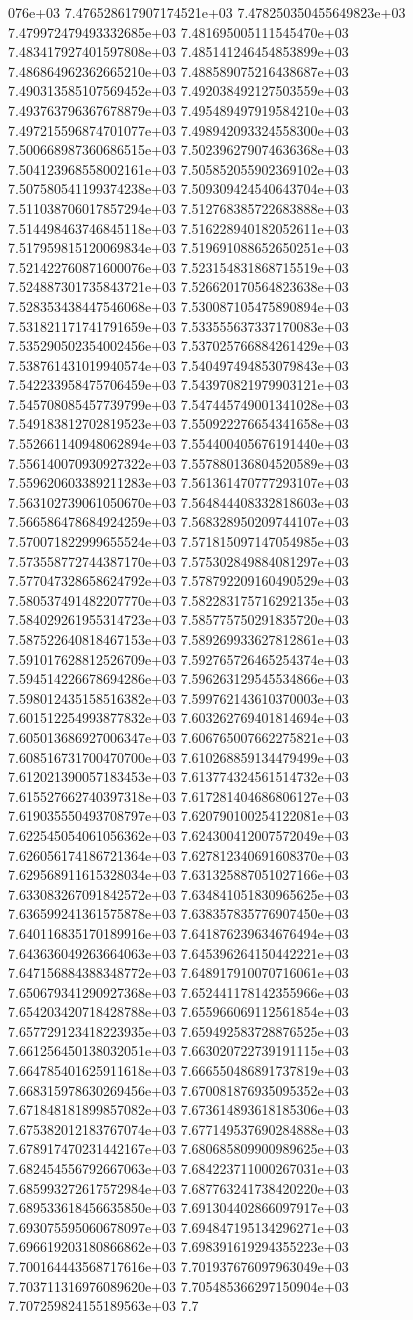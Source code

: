 076e+03	7.476528617907174521e+03	7.478250350455649823e+03	7.479972479493332685e+03	7.481695005111545470e+03	7.483417927401597808e+03	7.485141246454853899e+03	7.486864962362665210e+03	7.488589075216438687e+03	7.490313585107569452e+03	7.492038492127503559e+03	7.493763796367678879e+03	7.495489497919584210e+03	7.497215596874701077e+03	7.498942093324558300e+03	7.500668987360686515e+03	7.502396279074636368e+03	7.504123968558002161e+03	7.505852055902369102e+03	7.507580541199374238e+03	7.509309424540643704e+03	7.511038706017857294e+03	7.512768385722683888e+03	7.514498463746845118e+03	7.516228940182052611e+03	7.517959815120069834e+03	7.519691088652650251e+03	7.521422760871600076e+03	7.523154831868715519e+03	7.524887301735843721e+03	7.526620170564823638e+03	7.528353438447546068e+03	7.530087105475890894e+03	7.531821171741791659e+03	7.533555637337170083e+03	7.535290502354002456e+03	7.537025766884261429e+03	7.538761431019940574e+03	7.540497494853079843e+03	7.542233958475706459e+03	7.543970821979903121e+03	7.545708085457739799e+03	7.547445749001341028e+03	7.549183812702819523e+03	7.550922276654341658e+03	7.552661140948062894e+03	7.554400405676191440e+03	7.556140070930927322e+03	7.557880136804520589e+03	7.559620603389211283e+03	7.561361470777293107e+03	7.563102739061050670e+03	7.564844408332818603e+03	7.566586478684924259e+03	7.568328950209744107e+03	7.570071822999655524e+03	7.571815097147054985e+03	7.573558772744387170e+03	7.575302849884081297e+03	7.577047328658624792e+03	7.578792209160490529e+03	7.580537491482207770e+03	7.582283175716292135e+03	7.584029261955314723e+03	7.585775750291835720e+03	7.587522640818467153e+03	7.589269933627812861e+03	7.591017628812526709e+03	7.592765726465254374e+03	7.594514226678694286e+03	7.596263129545534866e+03	7.598012435158516382e+03	7.599762143610370003e+03	7.601512254993877832e+03	7.603262769401814694e+03	7.605013686927006347e+03	7.606765007662275821e+03	7.608516731700470700e+03	7.610268859134479499e+03	7.612021390057183453e+03	7.613774324561514732e+03	7.615527662740397318e+03	7.617281404686806127e+03	7.619035550493708797e+03	7.620790100254122081e+03	7.622545054061056362e+03	7.624300412007572049e+03	7.626056174186721364e+03	7.627812340691608370e+03	7.629568911615328034e+03	7.631325887051027166e+03	7.633083267091842572e+03	7.634841051830965625e+03	7.636599241361575878e+03	7.638357835776907450e+03	7.640116835170189916e+03	7.641876239634676494e+03	7.643636049263664063e+03	7.645396264150442221e+03	7.647156884388348772e+03	7.648917910070716061e+03	7.650679341290927368e+03	7.652441178142355966e+03	7.654203420718428788e+03	7.655966069112561854e+03	7.657729123418223935e+03	7.659492583728876525e+03	7.661256450138032051e+03	7.663020722739191115e+03	7.664785401625911618e+03	7.666550486891737819e+03	7.668315978630269456e+03	7.670081876935095352e+03	7.671848181899857082e+03	7.673614893618185306e+03	7.675382012183767074e+03	7.677149537690284888e+03	7.678917470231442167e+03	7.680685809900989625e+03	7.682454556792667063e+03	7.684223711000267031e+03	7.685993272617572984e+03	7.687763241738420220e+03	7.689533618456635850e+03	7.691304402866097917e+03	7.693075595060678097e+03	7.694847195134296271e+03	7.696619203180866862e+03	7.698391619294355223e+03	7.700164443568717616e+03	7.701937676097963049e+03	7.703711316976089620e+03	7.705485366297150904e+03	7.707259824155189563e+03	7.7